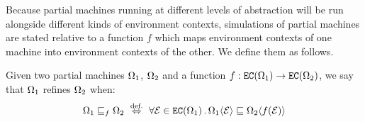 Because partial machines
running at different levels of abstraction
will be run alongside different kinds of environment contexts,
simulations of partial machines are stated relative to
a function $f$ which maps
environment contexts of one machine into
environment contexts of the other.
We define them as follows.

\begin{definition}
Given two partial machines $\Omega_1$, $\Omega_2$ and
a function $f : {{{\texttt{EC}}}({\Omega_1})} \rightarrow {{{\texttt{EC}}}({\Omega_2})}$,
we say that $\Omega_1$ refines $\Omega_2$ when:
\[ \PMach_1 \refines_f \PMach_2
	\ \stackrel{\text{def.}}{\Leftrightarrow}\ 
	\forall \Env \in \EC{\PMach_1} \,.\,
		\PMach_1 \langle \Env \rangle \refines
		\PMach_2 \langle f(\Env) \rangle \]
\end{definition}

%


